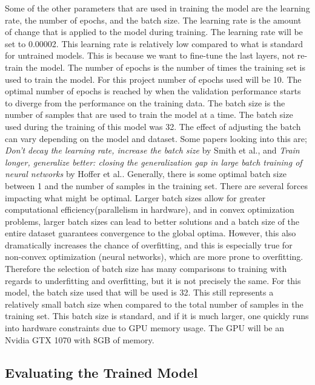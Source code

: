 Some of the other parameters that are used in training the model are the learning rate, the number of epochs, and the batch size. The learning rate is the amount of change that is applied to the model during training. The learning rate will be set to 0.00002. This learning rate is relatively low compared to what is standard for untrained models. This is because we want to fine-tune the last layers, not re-train the model. The number of epochs is the number of times the training set is used to train the model. For this project number of epochs used will be 10. The optimal number of epochs is reached by when the validation performance starts to diverge from the performance on the training data. The batch size is the number of samples that are used to train the model at a time. The batch size used during the training of this model was 32. The effect of adjusting the batch can vary depending on the model and dataset. Some papers looking into this are; \textit{Don't decay the learning rate, increase the batch size} by Smith et al.\cite{smith2017don}, and \textit{Train longer, generalize better: closing the generalization gap in large batch training of neural networks} by Hoffer et al.\cite{hoffer2017train}. Generally, there is some optimal batch size between 1 and the number of samples in the training set. There are several forces impacting what might be optimal. Larger batch sizes allow for greater computational efficiency(parallelism in hardware), and in convex optimization problems, larger batch sizes can lead to better solutions and a batch size of the entire dataset guarantees convergence to the global optima. However, this also dramatically increases the chance of overfitting, and this is especially true for non-convex optimization (neural networks), which are more prone to overfitting. Therefore the selection of batch size has many comparisons to training with regards to underfitting and overfitting, but it is not precisely the same. For this model, the batch size used that will be used is 32. This still represents a relatively small batch size when compared to the total number of samples in the training set. This batch size is standard, and if it is much larger, one quickly runs into hardware constraints due to GPU memory usage. The GPU will be an Nvidia GTX 1070 with 8GB of memory.

\subsection{Evaluating the Trained Model}


